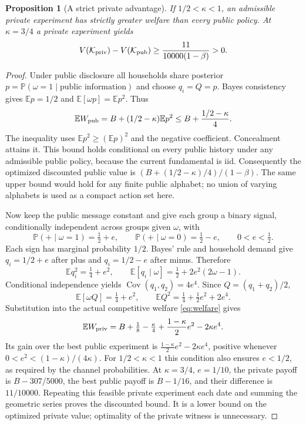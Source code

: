 \documentclass[11pt,a4paper]{article}
\newtheorem{proposition}[theorem]{Proposition}
\newcommand{\E}{\mathbb E}
\newcommand{\Prob}{\mathbb P}
\newcommand{\cK}{\mathcal K}
\begin{document}
\begin{proposition}[A strict private advantage]\label{prop:private}
If $1/2<\kappa<1$, an admissible private experiment has strictly greater welfare
than every public policy. At $\kappa=3/4$ a private experiment yields
\[
 V(\cK_{\rm priv})-V(\cK_{\rm pub})
 \geq\frac{11}{10000(1-\beta)}>0.
\]
\end{proposition}
\begin{proof}
Under public disclosure all households share posterior
$p=\Prob(\omega=1\mid\text{public information})$ and choose $q_i=Q=p$.
Bayes consistency gives $\E p=1/2$ and $\E[\omega p]=\E p^2$. Thus
\[
 \E W_{\rm pub}=B+(1/2-\kappa)\E p^2
 \leq B+\frac{1/2-\kappa}{4}.
\]
The inequality uses $\E p^2\geq(\E p)^2$ and the negative coefficient.
Concealment attains it. This bound holds conditional on every public history
under any admissible public policy, because the current fundamental is iid.
Consequently the optimized discounted public value is
$(B+(1/2-\kappa)/4)/(1-\beta)$. The same upper bound would hold for any
finite public alphabet; no union of varying alphabets is used as a compact
action set here.

Now keep the public message constant and give each group a binary signal,
conditionally independent across groups given $\omega$, with
\[
 \Prob(+\mid\omega=1)=\tfrac12+e,\qquad
 \Prob(+\mid\omega=0)=\tfrac12-e,
 \qquad 0<e<\tfrac12.
\]
Each sign has marginal probability $1/2$. Bayes' rule and household demand
give $q_i=1/2+e$ after plus and $q_i=1/2-e$ after minus. Therefore
\[
 \E q_i^2=\tfrac14+e^2,\qquad
 \E[q_i\mid\omega]=\tfrac12+2e^2(2\omega-1).
\]
Conditional independence yields
$\operatorname{Cov}(q_1,q_2)=4e^4$. Since $Q=(q_1+q_2)/2$,
\[
 \E[\omega Q]=\tfrac14+e^2,
 \qquad \E Q^2=\tfrac14+\tfrac12e^2+2e^4.
\]
Substitution into the actual competitive welfare \eqref{eq:welfare} gives
\[
 \E W_{\rm priv}
 =B+\tfrac18-\tfrac\kappa4
       +\frac{1-\kappa}{2}e^2-2\kappa e^4.
\]
Its gain over the best public experiment is
$\frac{1-\kappa}{2}e^2-2\kappa e^4$, positive whenever
$0<e^2<(1-\kappa)/(4\kappa)$. For $1/2<\kappa<1$ this condition also
ensures $e<1/2$, as required by the channel probabilities.
At $\kappa=3/4$, $e=1/10$, the private payoff is
$B-307/5000$, the best public payoff is $B-1/16$, and their difference is
$11/10000$. Repeating this feasible private experiment each date and summing
the geometric series proves the discounted bound. It is a lower bound on
the optimized private value; optimality of the private witness is unnecessary.
\end{proof}
\end{document}
